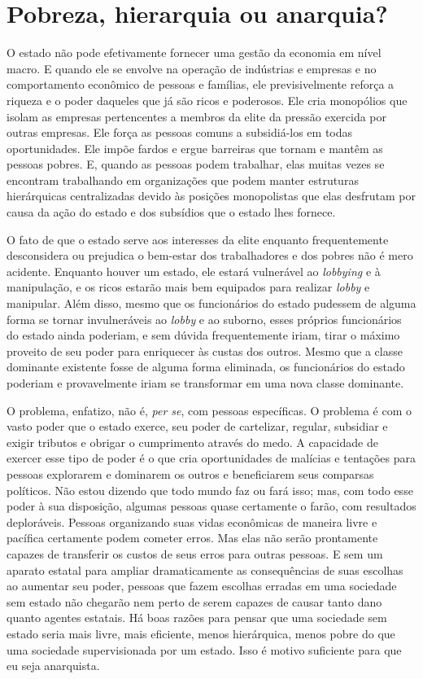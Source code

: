 \section{Pobreza, hierarquia ou anarquia?}

O estado não pode efetivamente fornecer uma gestão da economia em nível macro. E quando ele se envolve na operação de indústrias e empresas e no comportamento econômico de pessoas e famílias, ele previsivelmente reforça a riqueza e o poder daqueles que já são ricos e poderosos. Ele cria monopólios que isolam as empresas pertencentes a membros da elite da pressão exercida por outras empresas. Ele força as pessoas comuns a subsidiá-los em todas oportunidades. Ele impõe fardos e ergue barreiras que tornam e mantêm as pessoas pobres. E, quando as pessoas podem trabalhar, elas muitas vezes se encontram trabalhando em organizações que podem manter estruturas hierárquicas centralizadas devido às posições monopolistas que elas desfrutam por causa da ação do estado e dos subsídios que o estado lhes fornece.

O fato de que o estado serve aos interesses da elite enquanto frequentemente desconsidera ou prejudica o bem-estar dos trabalhadores e dos pobres não é mero acidente. Enquanto houver um estado, ele estará vulnerável ao \emph{lobbying} e à manipulação, e os ricos estarão mais bem equipados para realizar \emph{lobby} e manipular. Além disso, mesmo que os funcionários do estado pudessem de alguma forma se tornar invulneráveis ao \emph{lobby} e ao suborno, esses próprios funcionários do estado ainda poderiam, e sem dúvida frequentemente iriam, tirar o máximo proveito de seu poder para enriquecer às custas dos outros. Mesmo que a classe dominante existente fosse de alguma forma eliminada, os funcionários do estado poderiam e provavelmente iriam se transformar em uma nova classe dominante.

O problema, enfatizo, não é, \emph{per se}, com pessoas específicas. O problema é com o vasto poder que o estado exerce, seu poder de cartelizar, regular, subsidiar e exigir tributos e obrigar o cumprimento através do medo. A capacidade de exercer esse tipo de poder é o que cria oportunidades de malícias e tentações para pessoas explorarem e dominarem os outros e beneficiarem seus comparsas políticos. Não estou dizendo que todo mundo faz ou fará isso; mas, com todo esse poder à sua disposição, algumas pessoas quase certamente o farão, com resultados deploráveis. Pessoas organizando suas vidas econômicas de maneira livre e pacífica certamente podem cometer erros. Mas elas não serão prontamente capazes de transferir os custos de seus erros para outras pessoas. E sem um aparato estatal para ampliar dramaticamente as consequências de suas escolhas ao aumentar seu poder, pessoas que fazem escolhas erradas em uma sociedade sem estado não chegarão nem perto de serem capazes de causar tanto dano quanto agentes estatais. Há boas razões para pensar que uma sociedade sem estado seria mais livre, mais eficiente, menos hierárquica, menos pobre do que uma sociedade supervisionada por um estado. Isso é motivo suficiente para que eu seja anarquista.